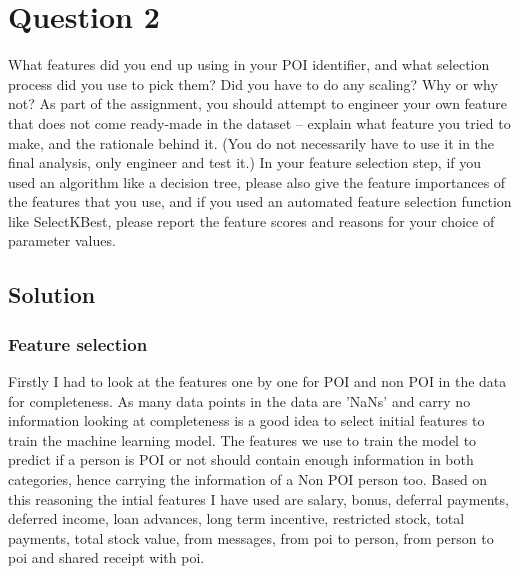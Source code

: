 \documentclass[12pt]{article}%
\begin{document}
\newpage
\section*{Question 2}

What features did you end up using in your POI identifier, and what selection process did you use to pick them? Did you have to do any scaling? Why or why not? As part of the assignment, you should attempt to engineer your own feature that does not come ready-made in the dataset -- explain what feature you tried to make, and the rationale behind it. (You do not necessarily have to use it in the final analysis, only engineer and test it.) In your feature selection step, if you used an algorithm like a decision tree, please also give the feature importances of the features that you use, and if you used an automated feature selection function like SelectKBest, please report the feature scores and reasons for your choice of parameter values.

\subsection*{Solution}

\subsubsection*{Feature selection}
Firstly I had to look at the features one by one for POI and non POI in the data for completeness. As many data points in the data are 'NaNs' and carry no information looking at completeness is a good idea to select initial features to train the machine learning model.
The features we use to train the model to predict if a person is POI or not should contain enough information in both categories, hence carrying the information of a Non POI person too. Based on this reasoning the intial features I have used are
salary, bonus, deferral payments, deferred income, loan advances, long term incentive, restricted stock, total payments, total stock value, from messages, from poi to person, from person to poi and shared receipt with poi.
\end{document}
